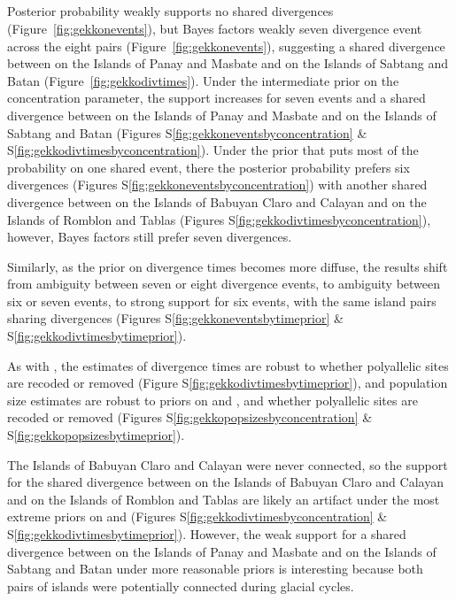 \subsection{}
Posterior probability weakly supports no shared divergences
(Figure~\ref{fig:gekkonevents}), but Bayes factors weakly seven divergence event
across the eight pairs (Figure~\ref{fig:gekkonevents}), suggesting a shared
divergence between
 on the Islands of Panay and Masbate
and
 on the Islands of Sabtang and Batan
(Figure~\ref{fig:gekkodivtimes}).
Under the intermediate prior on the concentration parameter, the support
increases for seven events and a shared divergence between
 on the Islands of Panay and Masbate
and
 on the Islands of Sabtang and Batan
(Figures S\ref{fig:gekkoneventsbyconcentration} \& S\ref{fig:gekkodivtimesbyconcentration}).
Under the prior that puts most of the probability on one shared event,
there the posterior probability prefers six divergences
(Figures S\ref{fig:gekkoneventsbyconcentration})
with another shared divergence between
 on the Islands of Babuyan Claro and Calayan
and
 on the Islands of Romblon and Tablas
(Figures S\ref{fig:gekkodivtimesbyconcentration}), however,
Bayes factors still prefer seven divergences.

Similarly, as the prior on divergence times becomes more diffuse,
the results shift from ambiguity between seven or eight divergence
events, to ambiguity between six or seven events, to strong
support for six events, with the same island pairs sharing
divergences
(Figures S\ref{fig:gekkoneventsbytimeprior} \& S\ref{fig:gekkodivtimesbytimeprior}).

As with , the estimates of divergence times
are robust to whether polyallelic sites are recoded or removed
(Figure S\ref{fig:gekkodivtimesbytimeprior}),
and population size estimates are robust to 
priors on \concentration and \divtime, and whether polyallelic sites
are recoded or removed
(Figures S\ref{fig:gekkopopsizesbyconcentration} \& S\ref{fig:gekkopopsizesbytimeprior}).

The Islands of Babuyan Claro and Calayan were never connected,
so the support for the shared divergence between
 on the Islands of Babuyan Claro and Calayan
and
 on the Islands of Romblon and Tablas
are likely an artifact under the most extreme priors on 
\concentration and \divtime 
(Figures S\ref{fig:gekkodivtimesbyconcentration} \& S\ref{fig:gekkodivtimesbytimeprior}).
However, the weak support for a shared divergence between
 on the Islands of Panay and Masbate
and
 on the Islands of Sabtang and Batan
under more reasonable priors is interesting because
both pairs of islands were potentially connected during
glacial cycles.


